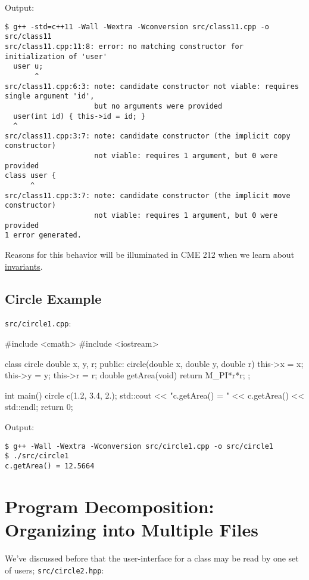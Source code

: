 \documentclass[12pt,letterpaper,twoside]{article}
\begin{document}
Output:

{\footnotesize
\begin{verbatim}
$ g++ -std=c++11 -Wall -Wextra -Wconversion src/class11.cpp -o src/class11
src/class11.cpp:11:8: error: no matching constructor for initialization of 'user'
  user u;
       ^
src/class11.cpp:6:3: note: candidate constructor not viable: requires single argument 'id', 
                     but no arguments were provided
  user(int id) { this->id = id; }
  ^
src/class11.cpp:3:7: note: candidate constructor (the implicit copy constructor) 
                     not viable: requires 1 argument, but 0 were provided
class user {
      ^
src/class11.cpp:3:7: note: candidate constructor (the implicit move constructor) 
                     not viable: requires 1 argument, but 0 were provided
1 error generated.
\end{verbatim}
}

Reasons for this behavior will be illuminated in CME 212 
when we learn about 
\href{https://en.wikipedia.org/wiki/Invariant_(mathematics)}{invariants}.

\subsection{Circle Example}
\texttt{src/circle1.cpp}:
\begin{cpp}
#include <cmath>
#include <iostream>

class circle {
  double x, y, r;
 public:
  circle(double x, double y, double r) {
    this->x = x;
    this->y = y;
    this->r = r;
  }
  double getArea(void) {
    return M_PI*r*r;
  }
};

int main() {
  circle c(1.2, 3.4, 2.);
  std::cout << "c.getArea() = " << c.getArea() << std::endl;
  return 0;
}
\end{cpp}

Output:

\begin{verbatim}
$ g++ -Wall -Wextra -Wconversion src/circle1.cpp -o src/circle1
$ ./src/circle1 
c.getArea() = 12.5664
\end{verbatim}

\section{Program Decomposition: {\large Organizing into Multiple Files}}
We've discussed before that the user-interface for a class may be read by
one set of users;
\texttt{src/circle2.hpp}:
\end{document}

